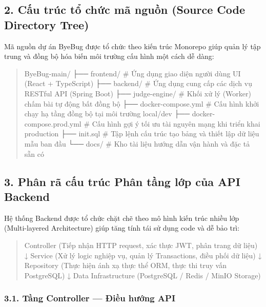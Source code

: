 \documentclass[12pt,a4paper]{article}
\renewcommand{\_}{\BreakableUnderscore}
\newenvironment{Shaded}{\vspace{3pt}\begin{quote}}{\end{quote}\vspace{3pt}}
\newcommand{\NormalTok}[1]{#1}
\begin{document}
\subsection{2. Cấu trúc tổ chức mã nguồn (Source Code Directory Tree)}

Mã nguồn dự án ByeBug được tổ chức theo kiến trúc Monorepo giúp quản lý tập trung và đồng bộ hóa biến môi trường cấu hình một cách dễ dàng:

\begin{Shaded}
\begin{Highlighting}[]
\NormalTok{ByeBug{-}main/}
\NormalTok{├── frontend/               \# Ứng dụng giao diện người dùng UI (React + TypeScript)}
\NormalTok{├── backend/                \# Ứng dụng cung cấp các dịch vụ RESTful API (Spring Boot)}
\NormalTok{├── judge{-}engine/           \# Khối xử lý (Worker) chấm bài tự động bất đồng bộ}
\NormalTok{├── docker{-}compose.yml      \# Cấu hình khởi chạy hạ tầng đồng bộ tại môi trường local/dev}
\NormalTok{├── docker{-}compose.prod.yml \# Cấu hình gợi ý tối ưu tài nguyên mạng khi triển khai production}
\NormalTok{├── init.sql                \# Tập lệnh cấu trúc tạo bảng và thiết lập dữ liệu mẫu ban đầu}
\NormalTok{└── docs/                   \# Kho tài liệu hướng dẫn vận hành và đặc tả sẵn có}
\end{Highlighting}
\end{Shaded}

\subsection{3. Phân rã cấu trúc Phân tầng lớp của API Backend}

Hệ thống Backend được tổ chức chặt chẽ theo mô hình kiến trúc nhiều lớp (Multi-layered Architecture) giúp tăng tính tái sử dụng code và dễ bảo trì:

\begin{Shaded}
\begin{Highlighting}[]
\NormalTok{Controller (Tiếp nhận HTTP request, xác thực JWT, phân trang dữ liệu)}
\NormalTok{    ↓}
\NormalTok{Service (Xử lý logic nghiệp vụ, quản lý Transactions, điều phối dữ liệu)}
\NormalTok{    ↓}
\NormalTok{Repository (Thực hiện ánh xạ thực thể ORM, thực thi truy vấn PostgreSQL)}
\NormalTok{    ↓}
\NormalTok{Data Infrastructure (PostgreSQL / Redis / MinIO Storage)}
\end{Highlighting}
\end{Shaded}

\subsubsection{3.1. Tầng Controller --- Điều hướng API}
\end{document}
